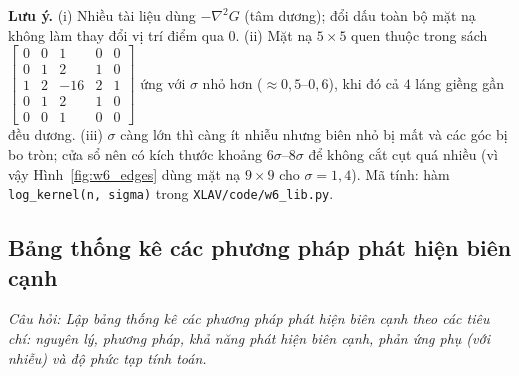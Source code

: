 \textbf{Lưu ý.} (i) Nhiều tài liệu dùng $-\nabla^2 G$ (tâm dương); đổi dấu toàn bộ mặt nạ không làm thay đổi vị trí điểm qua $0$. (ii) Mặt nạ $5 \times 5$ quen thuộc trong sách $\begin{bmatrix}0&0&1&0&0\\0&1&2&1&0\\1&2&-16&2&1\\0&1&2&1&0\\0&0&1&0&0\end{bmatrix}$ ứng với $\sigma$ nhỏ hơn ($\approx 0{,}5$--$0{,}6$), khi đó cả $4$ láng giềng gần đều dương. (iii) $\sigma$ càng lớn thì càng ít nhiễu nhưng biên nhỏ bị mất và các góc bị bo tròn; cửa sổ nên có kích thước khoảng $6\sigma$--$8\sigma$ để không cắt cụt quá nhiều (vì vậy Hình~\ref{fig:w6_edges} dùng mặt nạ $9 \times 9$ cho $\sigma = 1{,}4$). Mã tính: hàm \texttt{log\_kernel(n, sigma)} trong \texttt{XLAV/code/w6\_lib.py}.

\subsection{Bảng thống kê các phương pháp phát hiện biên cạnh}
\label{subsec:w6_edge_table}

\textit{Câu hỏi: Lập bảng thống kê các phương pháp phát hiện biên cạnh theo các tiêu chí: nguyên lý, phương pháp, khả năng phát hiện biên cạnh, phản ứng phụ (với nhiễu) và độ phức tạp tính toán.}


